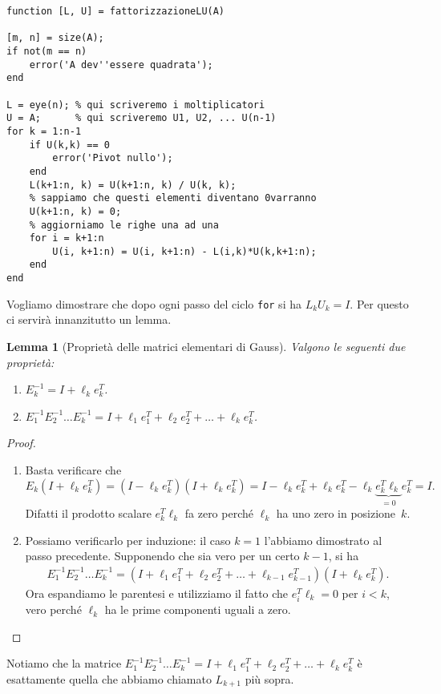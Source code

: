\documentclass[a4paper]{report}
\newtheorem{lemma}[theorem]{Lemma}
\theoremstyle{definiton}
\theoremstyle{remark}
\begin{document}
\begin{lstlisting}
function [L, U] = fattorizzazioneLU(A)

[m, n] = size(A);
if not(m == n)
    error('A dev''essere quadrata');
end

L = eye(n); % qui scriveremo i moltiplicatori
U = A;      % qui scriveremo U1, U2, ... U(n-1)
for k = 1:n-1
    if U(k,k) == 0
        error('Pivot nullo');
    end
    L(k+1:n, k) = U(k+1:n, k) / U(k, k);
    % sappiamo che questi elementi diventano 0varranno 
    U(k+1:n, k) = 0;
    % aggiorniamo le righe una ad una
    for i = k+1:n
        U(i, k+1:n) = U(i, k+1:n) - L(i,k)*U(k,k+1:n);
    end
end
\end{lstlisting}
Vogliamo dimostrare che dopo ogni passo del ciclo \lstinline{for} si ha $L_k U_k = I$. Per questo ci servirà innanzitutto un lemma.
\begin{lemma}[Proprietà delle matrici elementari di Gauss] Valgono le seguenti due proprietà:
\begin{enumerate}
    \item $E_k^{-1} = I + \ell_k e_k^T$.
    \item $E_1^{-1}E_2^{-1}\dots E_k^{-1} = I + \ell_1 e_1^T + \ell_2 e_2^T + \dots + \ell_k e_k^T$.
\end{enumerate}
\end{lemma}
\begin{proof}
\begin{enumerate}
    \item Basta verificare che
    \[
    E_k(I+\ell_ke_k^T) = (I-\ell_ke_k^T)(I+\ell_ke_k^T) = I - \ell_ke_k^T + \ell_ke_k^T - \ell_k\underbrace{e_k^T\ell_k}_{=0}e_k^T = I.
    \]
    Difatti il prodotto scalare $e_k^T\ell_k$ fa zero perché $\ell_k$ ha uno zero in posizione~$k$.
    \item Possiamo verificarlo per induzione: il caso $k=1$ l'abbiamo dimostrato al passo precedente. Supponendo che sia vero per un certo $k-1$, si ha
    \begin{align*}
    E_1^{-1}E_2^{-1}\dots E_k^{-1} = (I + \ell_1 e_1^T + \ell_2 e_2^T + \dots + \ell_{k-1} e_{k-1}^T)(I+\ell_ke_k^T).
    \end{align*}
    Ora espandiamo le parentesi e utilizziamo il fatto che $e_i^T\ell_k=0$ per $i<k$, vero perché $\ell_k$ ha le prime componenti uguali a zero.
\end{enumerate}
\end{proof}
Notiamo che la matrice $E_1^{-1}E_2^{-1}\dots E_k^{-1} = I + \ell_1 e_1^T + \ell_2 e_2^T + \dots + \ell_k e_k^T$ è esattamente quella che abbiamo chiamato $L_{k+1}$ più sopra.
\end{document}
